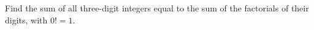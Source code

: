 Find the sum of all three-digit integers equal to the sum of the factorials of their digits, with $0!=1$.
